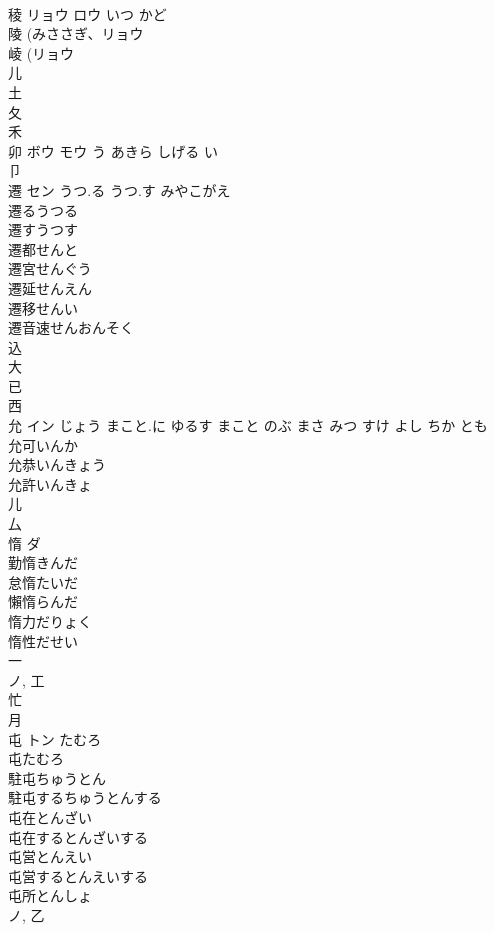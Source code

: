 \documentclass[8pt]{extreport}
\begin{document}
\begin{CJK}{UTF8}{min}
\\	稜	リョウ ロウ	いつ かど	
\\	陵 (みささぎ、リョウ 
\\	崚 (リョウ 
\\	儿 
\\	土 
\\	夂 
\\	禾 
\\	卯	ボウ モウ	う あきら しげる い	
\\	卩 
\\	遷	セン	うつ.る うつ.す みやこがえ	
\\	遷るうつる 
\\	遷すうつす 
\\	遷都せんと 
\\	遷宮せんぐう 
\\	遷延せんえん 
\\	遷移せんい 
\\	遷音速せんおんそく 
\\	込 
\\	大 
\\	已 
\\	西 
\\	允	イン	じょう まこと.に ゆるす まこと のぶ まさ みつ すけ よし ちか とも	
\\	允可いんか
\\	允恭いんきょう
\\	允許いんきょ
\\	儿 
\\	厶 
\\	惰	ダ		
\\	勤惰きんだ
\\	怠惰たいだ
\\	懶惰らんだ
\\	惰力だりょく
\\	惰性だせい
\\	一 
\\	ノ, 工 
\\	忙 
\\	月 
\\	屯	トン	たむろ	
\\	屯たむろ 
\\	駐屯ちゅうとん 
\\	駐屯するちゅうとんする 
\\	屯在とんざい 
\\	屯在するとんざいする 
\\	屯営とんえい 
\\	屯営するとんえいする 
\\	屯所とんしょ 
\\	ノ, 乙 

\end{CJK}
\end{document}
